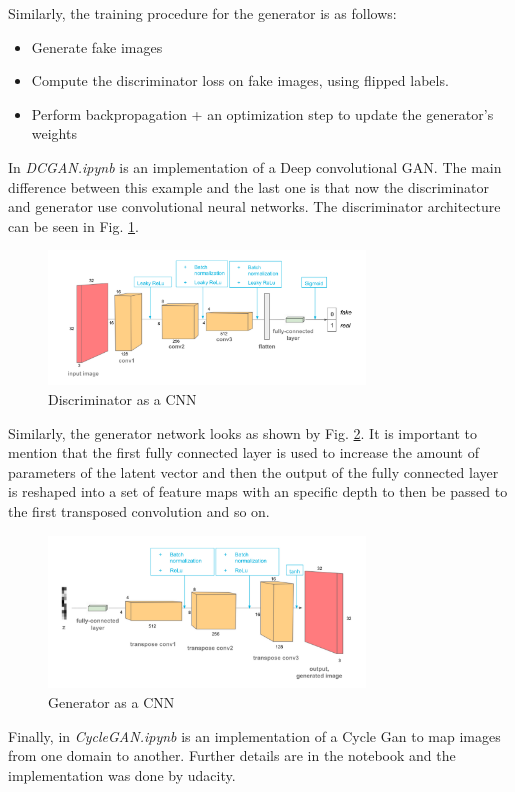 \documentclass{article}
\begin{document}
Similarly, the training procedure for the generator is as follows:

\begin{itemize}
    \item Generate fake images
    \item Compute the discriminator loss on fake images, using flipped labels.
    \item Perform backpropagation + an optimization step to update the generator's weights
\end{itemize}

In \textit{DCGAN.ipynb} is an implementation of a Deep convolutional GAN. The main difference between this example and the last one is that now the discriminator and generator use convolutional neural networks. The discriminator architecture can be seen in Fig. \ref{fig:f4}.

\begin{figure}[ht]
    \centering
    \includegraphics[width=0.75\textwidth,height=0.75\textheight,keepaspectratio]{images/discriminator.png}
    \captionsetup{justification=centering}
    \caption{Discriminator as a CNN}
    \label{fig:f4}
\end{figure}

Similarly, the generator network looks as shown by Fig. \ref{fig:f5}. It is important to mention that the first fully connected layer is used to increase the amount of parameters of the latent vector and then the output of the fully connected layer is reshaped into a set of feature maps with an specific depth to then be passed to the first transposed convolution and so on.

\begin{figure}[ht]
    \centering
    \includegraphics[width=0.75\textwidth,height=0.75\textheight,keepaspectratio]{images/generator.png}
    \captionsetup{justification=centering}
    \caption{Generator as a CNN}
    \label{fig:f5}
\end{figure}

Finally, in \textit{CycleGAN.ipynb} is an implementation of a Cycle Gan to map images from one domain to another. Further details are in the notebook and the implementation was done by udacity.

\printbibliography
\end{document}
